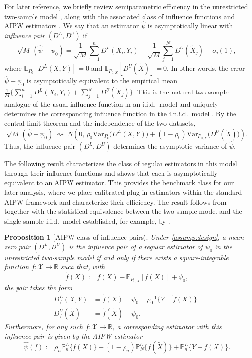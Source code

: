 \documentclass{article}
\theoremstyle{plain}
\newtheorem{proposition}{Proposition}
\theoremstyle{definition}
\newcommand{\E}{\mathbb{E}}
\newcommand{\Var}{\mathrm{Var}}
\newcommand{\R}{\mathbb{R}}
\newcommand{\1}{\mathbbm{1}}
\newcommand{\rhozero}{\rho_0}
\newcommand{\rhon}{\rho_n}
\newcommand{\Pl}{\mathbb{P}^{L}_n}
\newcommand{\Pu}{\mathbb{P}^{U}_N}
\newcommand{\Px}{P_{0,X}}
\begin{document}
For later reference, we briefly review semiparametric efficiency in the unrestricted two-sample model \citep{bickel1993efficient,li2023efficient}, along with the associated class of influence functions and AIPW estimators \citep{robinsCausal,robins1995analysis,bang2005doubly}.   We say that an estimator \(\widehat\psi\) is asymptotically linear with \emph{influence pair} \((D^L,D^U)\) if
\[
\sqrt{M}\,(\widehat\psi-\psi_0)
=
\frac{1}{\sqrt{M}}\sum_{i=1}^n D^L(X_i,Y_i)
+
\frac{1}{\sqrt{M}}\sum_{j=1}^N D^U(\widetilde X_j)
+
o_p(1),
\]
where \(\mathbb{E}_{P_0}[D^L(X,Y)]=0\) and \(\mathbb{E}_{\Px}[D^U(\widetilde X)]=0\). In other words, the error \(\widehat\psi-\psi_0\) is asymptotically equivalent to the empirical mean \(\frac{1}{M}\{\sum_{i=1}^n D^L(X_i,Y_i)+\sum_{j=1}^N D^U(\widetilde X_j)\}\). This is the natural two-sample analogue of the usual influence function in an i.i.d.\ model \citep{van2000asymptotic} and uniquely determines the corresponding influence function in the i.n.i.d.\ model \citep{bickel1993efficient}. By the central limit theorem and the independence of the two datasets,
\[
\sqrt{M}\,(\widehat\psi-\psi_0)
\;\rightsquigarrow\;
N\!\left(0,\,
\rhozero \Var_{P_0}\bigl(D^L(X,Y)\bigr)
+
(1-\rhozero)\Var_{\Px}\bigl(D^U(\widetilde X)\bigr)\right).
\]
Thus, the influence pair \((D^L,D^U)\) determines the asymptotic variance of \(\widehat\psi\).

The following result characterizes the class of regular estimators \citep{van2000asymptotic} in this model through their influence functions and shows that each is asymptotically equivalent to an AIPW estimator. This provides the benchmark class for our later analysis, where we place calibrated plug-in estimators within the standard AIPW framework and characterize their efficiency. The result follows from \citet{robins1995analysis} together with the statistical equivalence between the two-sample model and the single-sample i.i.d.\ model established, for example, by \citet{li2023efficient}.

\begin{proposition}[AIPW class of influence pairs]
\label{prop:if-class}
Under \cref{assump:design}, a mean-zero pair \((D^L,D^U)\) is the influence pair of a regular estimator of \(\psi_0\) in the unrestricted two-sample model if and only if there exists a square-integrable function \(f:\mathcal X\to\R\) such that, with
\[
\tilde f(X):=f(X)-\E_{\Px}[f(X)]+\psi_0,
\]
the pair takes the form
\begin{align}
\label{eq:if-class-L}
D_f^L(X,Y)
&=
\tilde f(X)-\psi_0+\rhozero^{-1}\{Y-\tilde f(X)\},\\
\label{eq:if-class-U}
D_f^U(\widetilde X)
&=
\tilde f(\widetilde X)-\psi_0.
\end{align}
Furthermore, for any such \(f:\mathcal X\to\R\), a corresponding estimator with this influence pair is given by the AIPW estimator
\begin{equation}
\label{eq:aipw-family}
\widehat\psi(f)
:=
\rhon \Pl\{f(X)\}
+
(1-\rhon)\Pu\{f(\widetilde X)\}
+
\Pl\{Y-f(X)\}.
\end{equation}
\end{proposition}
 
\end{document}
